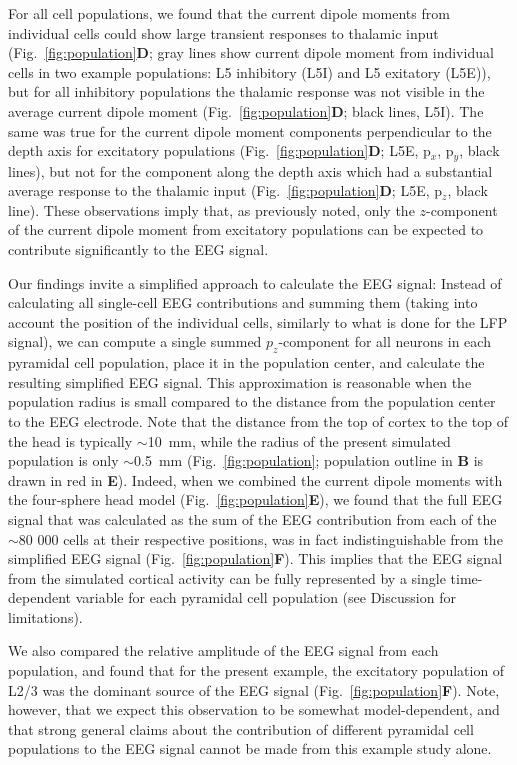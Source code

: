 \documentclass[preprint,10pt,authoryear]{elsarticle}
\newcommand{\gex}[1]{{\color{Orange}#1}}
\begin{document}
For all cell populations, we found that the current dipole moment\gex{s} from individual cells could show large transient responses to thalamic input (Fig.~\ref{fig:population}\textbf{D}; gray lines show current dipole moment from individual cells in two example populations: L5 inhibitory (L5I) and L5 exitatory (L5E)), but for all inhibitory populations the thalamic response was not visible in the average current dipole moment (Fig.~\ref{fig:population}\textbf{D}; black lines, L5I). The same was true for the current dipole moment components perpendicular to the depth axis for excitatory populations (Fig.~\ref{fig:population}\textbf{D}; L5E, p$_x$, p$_y$, black lines), but not for the component along the depth axis which had a substantial average response to the thalamic input (Fig.~\ref{fig:population}\textbf{D}; L5E, p$_z$, black line). 
These observations imply that, as previously noted, only the \gex{$z$}-component of the current dipole moment from excitatory populations can be expected to contribute significantly to the EEG signal.

Our findings invite a simplified approach to calculate the EEG signal: Instead of calculating all single-cell EEG contributions and summing them (taking into account the position of the individual cells, similarly to what is done for the LFP signal), we can compute \gex{a single} summed $p_z$-component \gex{for all neurons in} each pyramidal cell population, place it in the population center, and calculate the resulting simplified EEG signal. This approximation is reasonable when the population radius is small compared to the distance from the population center to the EEG electrode. Note that the distance from the top of cortex to the top of the head is typically $\sim$10~mm, while the radius of the \gex{present} simulated population is only 
$\sim$0.5~mm (Fig.~\ref{fig:population}; population outline in \textbf{B} is drawn in red in \textbf{E}).
Indeed, when we combined the current dipole moments with the four-sphere head model (Fig.~\ref{fig:population}\textbf{E}), we found that the full EEG signal that was calculated as the sum of the EEG contribution from each of the $\sim$80 000 cells at their respective positions, was in fact indistinguishable from the simplified EEG signal (Fig.~\ref{fig:population}\textbf{F}). This implies that \gex{the EEG signal from the simulated cortical activity can be fully represented by} a single time-dependent \gex{variable} for each pyramidal cell population (see Discussion for limitations).

We also compared the relative amplitude of the EEG signal from each population, and found that \gex{for the present example}, the excitatory population of L2/3 was the dominant source of the EEG signal (Fig.~\ref{fig:population}\textbf{F}). Note, however, that we expect this observation to be somewhat model-dependent, \gex{and that strong general claims about the contribution of different pyramidal cell populations to the EEG signal cannot be made from this example study alone.}
\end{document}
